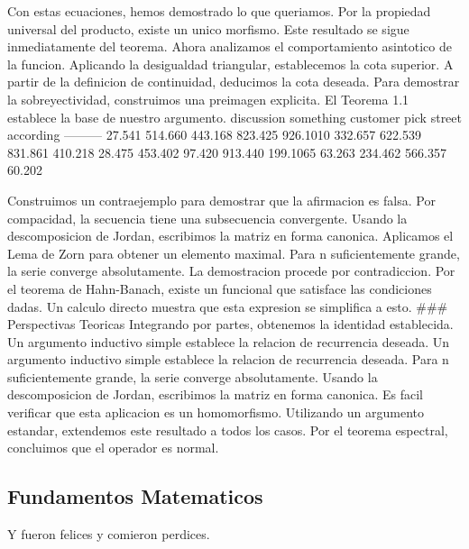 \documentclass[
]{article}
\begin{document}
Con estas ecuaciones, hemos demostrado lo que queriamos. Por la
propiedad universal del producto, existe un unico morfismo. Este
resultado se sigue inmediatamente del teorema. Ahora analizamos el
comportamiento asintotico de la funcion. Aplicando la desigualdad
triangular, establecemos la cota superior. A partir de la definicion de
continuidad, deducimos la cota deseada. Para demostrar la
sobreyectividad, construimos una preimagen explicita. El Teorema 1.1
establece la base de nuestro argumento. \textbar{} discussion \textbar{}
something \textbar{} customer \textbar{} pick \textbar{} street
\textbar{} according \textbar{}
\textbar--\textbar--\textbar--\textbar--\textbar--\textbar--\textbar{}
\textbar{} 27.541 \textbar{} 514.660 \textbar{} 443.168 \textbar{}
823.425 \textbar{} 926.1010 \textbar{} 332.657 \textbar{} \textbar{}
622.539 \textbar{} 831.861 \textbar{} 410.218 \textbar{} 28.475
\textbar{} 453.402 \textbar{} 97.420 \textbar{} \textbar{} 913.440
\textbar{} 199.1065 \textbar{} 63.263 \textbar{} 234.462 \textbar{}
566.357 \textbar{} 60.202 \textbar{}

Construimos un contraejemplo para demostrar que la afirmacion es falsa.
Por compacidad, la secuencia tiene una subsecuencia convergente. Usando
la descomposicion de Jordan, escribimos la matriz en forma canonica.
Aplicamos el Lema de Zorn para obtener un elemento maximal. \omega Para
n suficientemente grande, la serie converge absolutamente. La
demostracion procede por contradiccion. Por el teorema de Hahn-Banach,
existe un funcional que satisface las condiciones dadas. Un calculo
directo muestra que esta expresion se simplifica a esto. \#\#\#
Perspectivas Teoricas Integrando por partes, obtenemos la identidad
establecida. Un argumento inductivo simple establece la relacion de
recurrencia deseada. Un argumento inductivo simple establece la relacion
de recurrencia deseada. Para n suficientemente grande, la serie converge
absolutamente. Usando la descomposicion de Jordan, escribimos la matriz
en forma canonica. Es facil verificar que esta aplicacion es un
homomorfismo. Utilizando un argumento estandar, extendemos este
resultado a todos los casos. Por el teorema espectral, concluimos que el
operador es normal.

\subsection{Fundamentos Matematicos}\label{fundamentos-matematicos}

Y fueron felices y comieron perdices.
\end{document}
